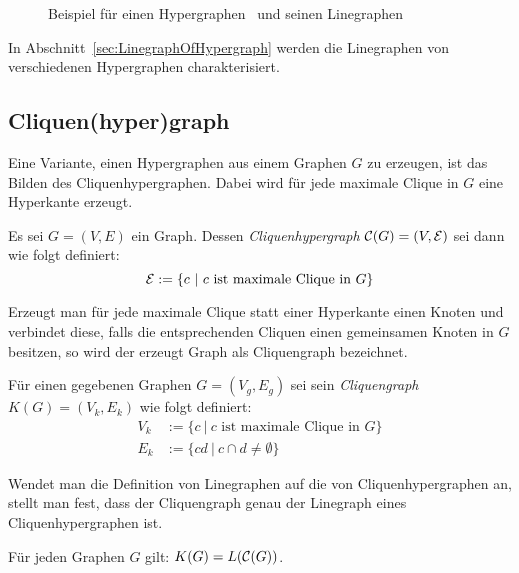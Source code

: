 \begin{figure}[htbp]
{
    }
    \hspace*{\fill}
    \caption[Beispiel für einen Hypergraphen und seinen Linegraphen]{Beispiel für einen Hypergraphen~ und seinen Linegraphen~}
    \label{pic:bsp_Linegraph}
\end{figure}


In Abschnitt~\ref{sec:LinegraphOfHypergraph} werden die Linegraphen von verschiedenen Hypergraphen charakterisiert.

\subsection{Cliquen(hyper)graph}
Eine Variante, einen Hypergraphen aus einem Graphen $G$ zu erzeugen, ist das Bilden des Cliquenhypergraphen. Dabei wird für jede maximale Clique in $G$ eine Hyperkante erzeugt.

\begin{mydef}
    Es sei $G=(V,E)$ ein Graph. Dessen \emph{Cliquenhypergraph} $\mathcal{C}(G)=(V,\mathcal{E})$ sei dann wie folgt definiert:
    \[ \mathcal{E}:= \{ c \ |\ \text{$c$ ist maximale Clique in $G$} \} \]
\end{mydef}

Erzeugt man für jede maximale Clique statt einer Hyperkante einen Knoten und verbindet diese, falls die entsprechenden Cliquen einen gemeinsamen Knoten in $G$ besitzen, so wird der erzeugt Graph als Cliquengraph bezeichnet.

\begin{mydef}
    Für einen gegebenen Graphen $G=(V_g,E_g)$ sei sein \emph{Cliquengraph} $K(G)=(V_k,E_k)$ wie folgt definiert:
    \begin{align*}
        V_k & := \{ c \ |\ \text{$c$ ist maximale Clique in $G$} \} \\
        E_k & := \{ cd \ |\ c \cap d \neq \emptyset \}
    \end{align*}
\end{mydef}

Wendet man die Definition von Linegraphen auf die von Cliquenhypergraphen an, stellt man fest, dass der Cliquengraph genau der Linegraph eines Cliquenhypergraphen ist.

\begin{Lemma}\label{lem:Cliquegraph}
    Für jeden Graphen $G$ gilt: $K(G) = L(\mathcal{C}(G))$.
\end{Lemma}

